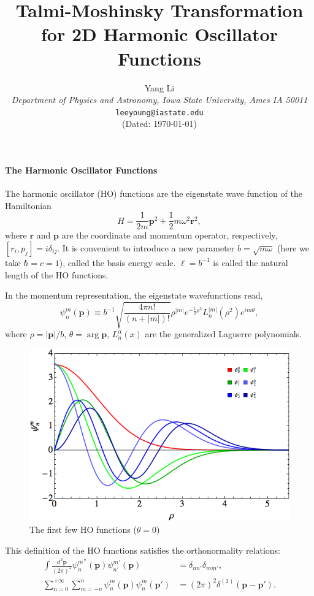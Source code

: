 \documentclass[a4paper,10pt]{article}
\date{}
\title{Talmi-Moshinsky Transformation for 2D Harmonic Oscillator Functions}
\author{Yang Li \\
\textit{Department of Physics and Astronomy, Iowa State University, Ames IA 50011} \\
\texttt{leeyoung@iastate.edu} \\
(Dated: \today)
}
\begin{document}
 \maketitle

\paragraph{The Harmonic Oscillator Functions} The harmonic oscillator (HO) functions are the eigenstate wave function of the 
Hamiltonian 
\begin{equation}
  H = \frac{1}{2m}\bm p^2 + \frac{1}{2} m\omega^2 \bm r^2,
\end{equation}
where $\bm r$ and $\bm p$ are the coordinate and momentum operator, respectively, $[r_i, p_j] = i\delta_{ij}$. It is convenient
to introduce a new parameter $b = \sqrt{m\omega}$ (here we take $\hbar = c =1$), called the basis energy scale. $\ell = b^{-1}$ 
is called the natural length of the HO functions.

In the momentum representation, the eigenstate wavefunctions read, 
\begin{equation}\label{eq2}
 \psi^m_{n}(\bm p) \equiv b^{-1} \sqrt{\frac{4\pi n!}{(n+|m|)!}} \rho^{|m|} e^{-\frac{1}{2}\rho^2} L_n^{|m|}(\rho^2) e^{im\theta},
\end{equation}
where $\rho = |\bm p|/b$, $\theta = \arg \bm p$, $L_n^\alpha(x)$ are the generalized Laguerre polynomials.
%
\begin{figure}
 \centering 
\includegraphics[width=.5\textwidth]{HOF}
\caption{The first few HO functions ($\theta = 0$)}
\end{figure}
%
This definition of the HO functions satisfies the orthonormality relations: 
\begin{align}\label{orthonormality}
 \int \frac{\mathrm{d}^2\bm p}{(2\pi)^2} {\psi_n^m}^*(\bm p)\psi_{n'}^{m'}(\bm p) &= \delta_{nn'}\delta_{mm'}, \\
 \sum_{n=0}^{+\infty} \sum_{m=-n}^n \psi_n^m(\bm p) \psi_n^m(\bm p') &= (2\pi)^2\delta^{(2)}(\bm p-\bm p').
\end{align}
\end{document}
